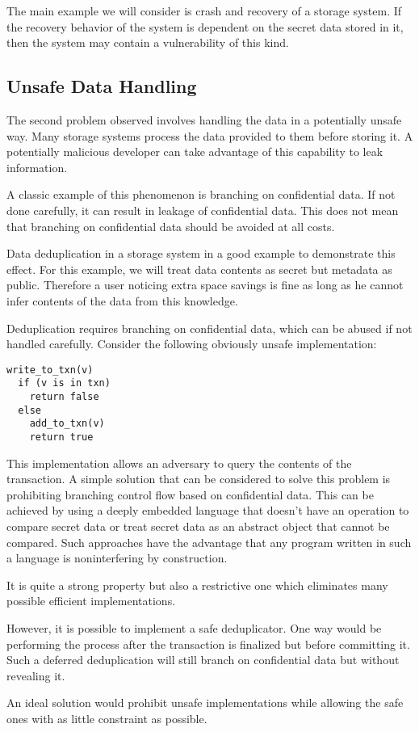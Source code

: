 The main example we will consider is crash and recovery of a storage system. If the recovery behavior of the system is dependent on the secret data stored in it, then the system may contain a vulnerability of this kind.


\subsection{Unsafe Data Handling}
The second problem observed involves handling the data in a potentially unsafe way. Many storage systems process the data provided to them before storing it. A potentially malicious developer can take advantage of this capability to leak information. 

A classic example of this phenomenon is branching on confidential data. If not done carefully, it can result in leakage of confidential data. This does not mean that branching on confidential data should be avoided at all costs. 

Data deduplication in a storage system in a good example to demonstrate this effect. For this example, we will treat data contents as secret but metadata as public. Therefore a user noticing extra space savings is fine as long as he cannot infer contents of the data from this knowledge. 

Deduplication requires branching on confidential data, which can be abused if not handled carefully. Consider the following obviously unsafe implementation: 

\begin{lstlisting}
write_to_txn(v)
  if (v is in txn)
    return false
  else
    add_to_txn(v)
    return true
\end{lstlisting}

This implementation allows an adversary to query the contents of the transaction. A simple solution that can be considered to solve this problem is prohibiting branching control flow based on confidential data. This can be achieved by using a deeply embedded language that doesn’t have an operation to compare secret data or treat secret data as an abstract object that cannot be compared. Such approaches have the advantage that any program written in such a language is noninterfering by construction. 

It is quite a strong property but also a restrictive one which eliminates many possible efficient implementations. 

However, it is possible to implement a safe deduplicator. One way would be performing the process after the transaction is finalized but before committing it. Such a deferred deduplication will still branch on confidential data but without revealing it. 

An ideal solution would prohibit unsafe implementations while allowing the safe ones with as little constraint as possible. 

